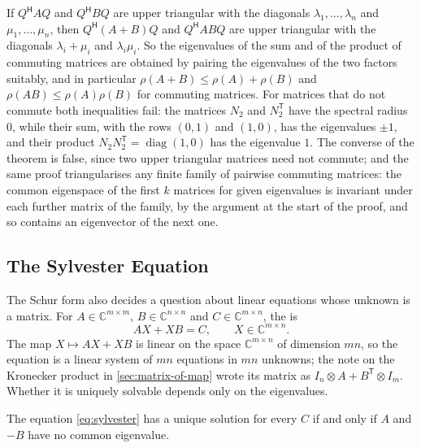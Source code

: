 If $Q^{\mathsf H}AQ$ and $Q^{\mathsf H}BQ$ are upper triangular with the diagonals $\lambda_1,\ldots,\lambda_n$ and $\mu_1,\ldots,\mu_n$, then $Q^{\mathsf H}(A+B)Q$ and $Q^{\mathsf H}ABQ$ are upper triangular with the diagonals $\lambda_i+\mu_i$ and $\lambda_i\mu_i$. So the eigenvalues of the sum and of the product of commuting matrices are obtained by pairing the eigenvalues of the two factors suitably, and in particular $\rho(A+B)\le\rho(A)+\rho(B)$ and $\rho(AB)\le\rho(A)\rho(B)$ for commuting matrices. For matrices that do not commute both inequalities fail: the matrices $N_2$ and $N_2^{\mathsf T}$ have the spectral radius $0$, while their sum, with the rows $(0,1)$ and $(1,0)$, has the eigenvalues $\pm1$, and their product $N_2N_2^{\mathsf T}=\operatorname{diag}(1,0)$ has the eigenvalue $1$. The converse of the theorem is false, since two upper triangular matrices need not commute; and the same proof triangularises any finite family of pairwise commuting matrices: the common eigenspace of the first $k$ matrices for given eigenvalues is invariant under each further matrix of the family, by the argument at the start of the proof, and so contains an eigenvector of the next one.

\subsection{The Sylvester Equation}

The Schur form also decides a question about linear equations whose unknown is a matrix. For $A\in\mathbb C^{m\times m}$, $B\in\mathbb C^{n\times n}$ and $C\in\mathbb C^{m\times n}$, the  is
\begin{equation}
AX+XB=C,\qquad X\in\mathbb C^{m\times n}.
\label{eq:sylvester}
\end{equation}
The map $X\mapsto AX+XB$ is linear on the space $\mathbb C^{m\times n}$ of dimension $mn$, so the equation is a linear system of $mn$ equations in $mn$ unknowns; the note on the Kronecker product in \cref{sec:matrix-of-map} wrote its matrix as $I_n\otimes A+B^{\mathsf T}\otimes I_m$. Whether it is uniquely solvable depends only on the eigenvalues.

\begin{theorem}
\label{thm:sylvester-equation}
The equation \eqref{eq:sylvester} has a unique solution for every $C$ if and only if $A$ and $-B$ have no common eigenvalue.
\end{theorem}

